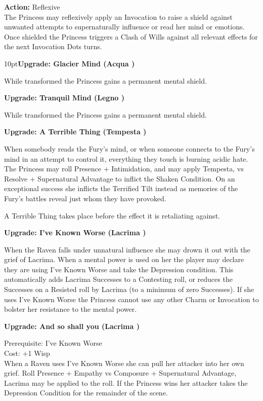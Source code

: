 \noindent \textbf{Action:} Reflexive \\

\noindent The Princess may reflexively apply an Invocation to raise a shield against unwanted attempts to supernaturally influence or read her mind or emotions. Once shielded the Princess triggers a Clash of Wills against all relevant effects for the next Invocation Dots turns.

\begin{myindentpar}{10pt}\textbf{Upgrade: Glacier Mind (Acqua \textbullet\textbullet\textbullet\textbullet)}

While transformed the Princess gains a permanent mental shield. 

\textbf{Upgrade: Tranquil Mind (Legno \textbullet\textbullet\textbullet\textbullet)}

While transformed the Princess gains a permanent mental shield. 

\textbf{Upgrade: A Terrible Thing (Tempesta \textbullet\textbullet\textbullet)}

When somebody reads the Fury's mind, or when someone connects to the Fury's mind in an attempt to control it, everything they touch is burning acidic hate. The Princess may roll Presence + Intimidation, and may apply Tempesta, vs Resolve + Supernatural Advantage to inflict the Shaken Condition. On an exceptional success she inflicts the Terrified Tilt instead as memories of the Fury's battles reveal just whom they have provoked. 

A Terrible Thing takes place before the effect it is retaliating against. 

\textbf{Upgrade: I've Known Worse (Lacrima \textbullet\textbullet\textbullet)}

When the Raven falls under unnatural influence she may drown it out with the grief of Lacrima. When a mental power is used on her the player may declare they are using I've Known Worse and take the Depression condition. This automatically adds Lacrima Successes to a Contesting roll, or reduces the Successes on a Resisted roll by Lacrima (to a minimum of zero Successes). If she uses I've Known Worse the Princess cannot use any other Charm or Invocation to bolster her resistance to the mental power. 

\textbf{Upgrade: And so shall you (Lacrima \textbullet\textbullet\textbullet\textbullet\textbullet)}

\noindent Prerequisite: I've Known Worse \\

\noindent Cost: +1 Wisp \\

\noindent When a Raven uses I've Known Worse she can pull her attacker into her own grief. Roll Presence + Empathy vs Composure + Supernatural Advantage, Lacrima may be applied to the roll. If the Princess wins her attacker takes the Depression Condition for the remainder of the scene. 

\end{myindentpar}


